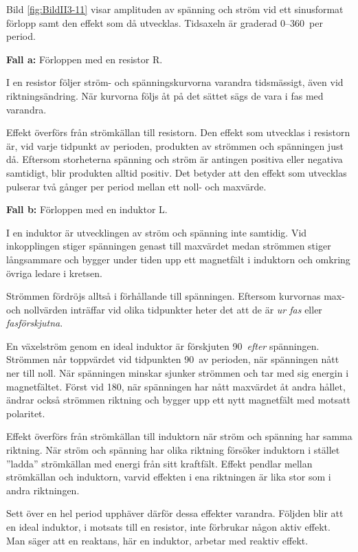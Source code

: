 
Bild \ref{fig:BildII3-11} visar amplituden av spänning och ström vid ett
sinusformat förlopp samt den effekt som då utvecklas.
Tidsaxeln är graderad 0--360\degree~per period.

\textbf{Fall a:} Förloppen med en resistor R.

I en resistor följer ström- och spänningskurvorna varandra tidsmässigt, även
vid riktningsändring.
När kurvorna följs åt på det sättet sägs de vara i fas med varandra.

Effekt överförs från strömkällan till resistorn.
Den effekt som utvecklas i resistorn är, vid varje tidpunkt av perioden,
produkten av strömmen och spänningen just då.
Eftersom storheterna spänning och ström är antingen positiva eller negativa
samtidigt, blir produkten alltid positiv.
Det betyder att den effekt som utvecklas pulserar två gånger per period mellan
ett noll- och maxvärde.

\textbf{Fall b:} Förloppen med en induktor L.

I en induktor är utvecklingen av ström och spänning inte samtidig.
Vid inkopplingen stiger spänningen genast till maxvärdet medan strömmen stiger
långsammare och bygger under tiden upp ett magnetfält i induktorn och omkring
övriga ledare i kretsen.

Strömmen fördröjs alltså i förhållande till spänningen.
Eftersom kurvornas max- och nollvärden inträffar vid olika tidpunkter heter
det att de är \emph{ur fas} eller \emph{fasförskjutna}.

En växelström genom en ideal induktor är förskjuten 90\degree~\emph{efter}
spänningen.
Strömmen når toppvärdet vid tidpunkten 90\degree~av perioden, när spänningen
nått ner till noll.
När spänningen minskar sjunker strömmen och tar med sig energin i
magnetfältet.
Först vid 180\degree, när spänningen har nått maxvärdet åt andra hållet, ändrar
också strömmen riktning och bygger upp ett nytt magnetfält med motsatt
polaritet.

Effekt överförs från strömkällan till induktorn när ström och spänning har
samma riktning.
När ström och spänning har olika riktning försöker induktorn i stället
''ladda'' strömkällan med energi från sitt kraftfält.
Effekt pendlar mellan strömkällan och induktorn, varvid effekten i
ena riktningen är lika stor som i andra riktningen.

Sett över en hel period upphäver därför dessa effekter varandra.
Följden blir att en ideal induktor, i motsats till en resistor, inte förbrukar
någon aktiv effekt.
Man säger att en reaktans, här en induktor, arbetar med reaktiv effekt.

